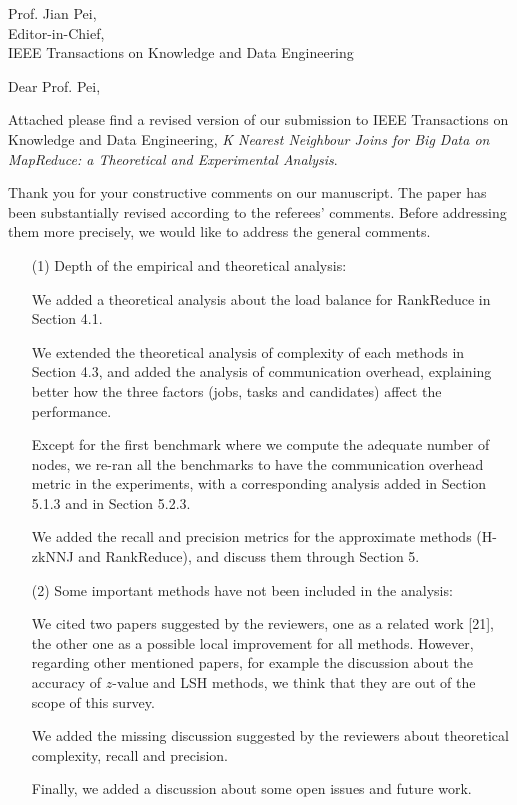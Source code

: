 \documentclass[11pt]{letter}
\date{}
\begin{document}
\noindent
Prof. Jian Pei,\\
Editor-in-Chief,\\
IEEE Transactions on Knowledge and Data Engineering

\vspace{0.3cm}
\noindent
Dear Prof. Pei,


Attached please find a revised version of our submission to IEEE Transactions on Knowledge and Data Engineering,
{\em K Nearest Neighbour Joins for Big Data on MapReduce: a Theoretical and Experimental Analysis}.

Thank you for your constructive comments on our manuscript. The paper has been substantially revised according to the 
referees' comments. Before addressing them more precisely, we would like to address the general comments. 

\begin{itemize}
%
\item[(1)] Depth of the empirical and theoretical analysis: 

We added a theoretical analysis about the load balance for RankReduce in Section 4.1. 

We extended the theoretical analysis of complexity of each methods in Section 4.3, and added the analysis of 
communication overhead, explaining better how the three factors  (jobs, tasks and candidates) affect the performance. 

Except for the first benchmark where we compute the adequate number of nodes, we re-ran all the benchmarks to have the 
communication overhead metric in the experiments, with a corresponding analysis added in Section 5.1.3 and in Section 
5.2.3. 

We added the recall and precision metrics for the approximate methods (H-zkNNJ and RankReduce), and discuss them 
through Section 5.
%
\item[(2)]  Some important methods have not been included in the analysis: 

We cited two papers suggested by the reviewers, one as a related work [21], the other one as a possible local 
improvement for all methods. However, regarding other mentioned papers, for example the discussion about the accuracy 
of $z$-value and LSH methods, we think that they are out of the scope of this survey. 

We added the missing discussion suggested by the reviewers about theoretical complexity, recall and precision. 

Finally, we added a discussion about some open issues and future work.


\end{itemize}
\end{document}
